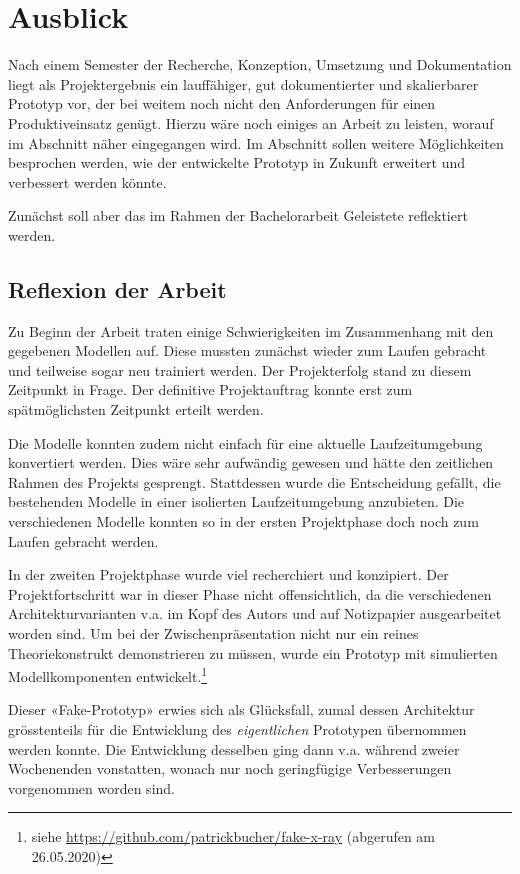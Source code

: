\section{Ausblick}

Nach einem Semester der Recherche, Konzeption, Umsetzung und Dokumentation liegt als Projektergebnis ein lauffähiger, gut dokumentierter und skalierbarer Prototyp vor, der bei weitem noch nicht den Anforderungen für einen Produktiveinsatz genügt. Hierzu wäre noch einiges an Arbeit zu leisten, worauf im Abschnitt  näher eingegangen wird. Im Abschnitt  sollen weitere Möglichkeiten besprochen werden, wie der entwickelte Prototyp in Zukunft erweitert und verbessert werden könnte.

Zunächst soll aber das im Rahmen der Bachelorarbeit Geleistete reflektiert werden.

\subsection{Reflexion der Arbeit}

Zu Beginn der Arbeit traten einige Schwierigkeiten im Zusammenhang mit den gegebenen Modellen auf. Diese mussten zunächst wieder zum Laufen gebracht und teilweise sogar neu trainiert werden. Der Projekterfolg stand zu diesem Zeitpunkt in Frage. Der definitive Projektauftrag konnte erst zum spätmöglichsten Zeitpunkt erteilt werden.

Die Modelle konnten zudem nicht einfach für eine aktuelle Laufzeitumgebung konvertiert werden. Dies wäre sehr aufwändig gewesen und hätte den zeitlichen Rahmen des Projekts gesprengt. Stattdessen wurde die Entscheidung gefällt, die bestehenden Modelle in einer isolierten Laufzeitumgebung anzubieten. Die verschiedenen Modelle konnten so in der ersten Projektphase doch noch zum Laufen gebracht werden.

In der zweiten Projektphase wurde viel recherchiert und konzipiert. Der Projektfortschritt war in dieser Phase nicht offensichtlich, da die verschiedenen Architekturvarianten v.a. im Kopf des Autors und auf Notizpapier ausgearbeitet worden sind. Um bei der Zwischenpräsentation nicht nur ein reines Theoriekonstrukt demonstrieren zu müssen, wurde ein Prototyp mit simulierten Modellkomponenten entwickelt.\footnote{siehe \url{https://github.com/patrickbucher/fake-x-ray} (abgerufen am 26.05.2020)}

Dieser «Fake-Prototyp» erwies sich als Glücksfall, zumal dessen Architektur grösstenteils für die Entwicklung des \textit{eigentlichen} Prototypen übernommen werden konnte. Die Entwicklung desselben ging dann v.a. während zweier Wochenenden vonstatten, wonach nur noch geringfügige Verbesserungen vorgenommen worden sind.

